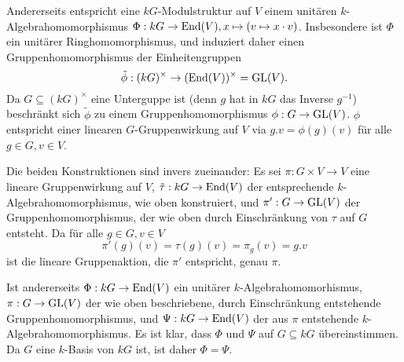 \documentclass[a4paper,10pt]{article}
\begin{document}
Andererseits entspricht eine $kG$-Modulstruktur auf $V$ einem unitären $k$-Algebra\-homo\-morphismus $\Phi : kG \to \operatorname{End}(V), x \mapsto (v \mapsto x \cdot v)$. Insbesondere ist $\Phi$ ein unitärer Ringhomomorphismus, und induziert daher einen Gruppenhomomorphismus der Einheitengruppen
\[
 \tilde{\phi} : (kG)^\times \to (\operatorname{End}(V))^\times = \operatorname{GL}(V).
\]
Da $G \subseteq (kG)^\times$ eine Unterguppe ist (denn $g$ hat in $kG$ das Inverse $g^{-1}$) beschränkt sich $\tilde{\phi}$ zu einem Gruppenhomomorphismus $\phi : G \to \operatorname{GL}(V)$. $\phi$ entspricht einer linearen $G$-Gruppenwirkung auf $V$ via $g.v = \phi(g)(v)$ für alle $g \in G, v \in V$.

Die beiden Konstruktionen sind invers zueinander: Es sei $\pi : G \times V \to V$ eine lineare Gruppenwirkung auf $V$, $\tilde{\tau} : kG \to \operatorname{End}(V)$ der entsprechende $k$-Algebra\-homo\-morphismus, wie oben konstruiert, und $\pi' : G \to \operatorname{GL}(V)$ der Gruppenhomomorphismus, der wie oben durch Einschränkung von $\tau$ auf $G$ entsteht. Da für alle $g \in G, v \in V$
\[
 \pi'(g)(v) = \tau(g)(v) = \pi_g(v) = g.v
\]
ist die lineare Gruppenaktion, die $\pi'$ entspricht, genau $\pi$.

Ist andererseits $\Phi : kG \to \operatorname{End}(V)$ ein unitärer $k$-Algebra\-homo\-morhismus, $\pi : G \to \operatorname{GL}(V)$ der wie oben beschriebene, durch Einschränkung entstehende Gruppenhomomorphismus, und $\Psi : kG \to \operatorname{End}(V)$ der aus $\pi$ entstehende $k$-Algebra\-homo\-morphismus. Es ist klar, dass $\Phi$ und $\Psi$ auf $G \subseteq kG$ übereinstimmen. Da $G$ eine $k$-Basis von $kG$ ist, ist daher $\Phi = \Psi$.
\end{document}
